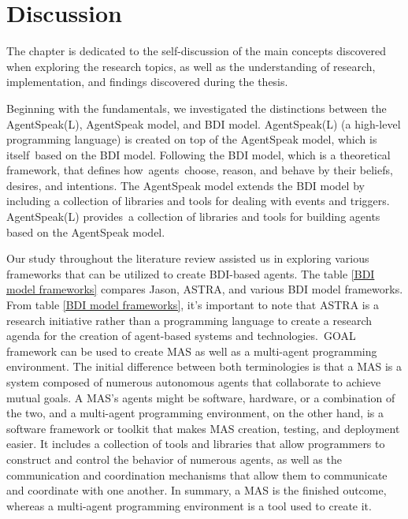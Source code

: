 {\chapter{Discussion}}

The chapter is dedicated to the self-discussion of the main concepts discovered when exploring the research topics, as well as the understanding of research, implementation, and findings discovered during the thesis.

\vspace{.5cm}

Beginning with the fundamentals, we investigated the distinctions between the AgentSpeak(L), AgentSpeak model, and \ac{BDI} model. AgentSpeak(L) (a high-level programming language) is created on top of the AgentSpeak model, which is itself based on the \ac{BDI} model. Following the \ac{BDI} model, which is a theoretical framework, that defines how agents choose, reason, and behave by their beliefs, desires, and intentions. The AgentSpeak model extends the \ac{BDI} model by including a collection of libraries and tools for dealing with events and triggers. AgentSpeak(L) provides a collection of libraries and tools for building agents based on the AgentSpeak model.

\vspace{.5cm}

Our study throughout the literature review assisted us in exploring various frameworks that can be utilized to create \ac{BDI}-based agents. The table \ref{BDI model frameworks} compares Jason, ASTRA, and various \ac{BDI} model frameworks. From table \ref{BDI model frameworks}, it's important to note that ASTRA is a research initiative rather than a programming language to create a research agenda for the creation of agent-based systems and technologies. GOAL framework can be used to create \ac{MAS} as well as a multi-agent programming environment. The initial difference between both terminologies is that a \ac{MAS} is a system composed of numerous autonomous agents that collaborate to achieve mutual goals. A \ac{MAS}'s agents might be software, hardware, or a combination of the two, and a multi-agent programming environment, on the other hand, is a software framework or toolkit that makes \ac{MAS} creation, testing, and deployment easier. It includes a collection of tools and libraries that allow programmers to construct and control the behavior of numerous agents, as well as the communication and coordination mechanisms that allow them to communicate and coordinate with one another. In summary, a \ac{MAS} is the finished outcome, whereas a multi-agent programming environment is a tool used to create it.

